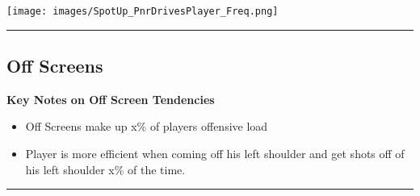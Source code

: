 \documentclass[a4paper,12pt]{article}
\begin{document}
\begin{table}[H]
{\begin{minipage}[t]{0.6\textwidth}
{\begin{tabular}
                
            

            \bottomrule
        \end{tabular}
        } %
    \end{minipage}
    } %
    \hfill %
    \begin{minipage}[c]{0.35\textwidth} %
        \flushright
        \texttt{[image: images/SpotUp\_PnrDrivesPlayer\_Freq.png]} %
    \end{minipage}
\end{table}

\vspace{-1em} %
\hrule height 1pt width 1\textwidth %
\vspace{1em} %
\clearpage











\subsection{Off Screens}
\vspace{1.25em} %
\textbf{Key Notes on Off Screen Tendencies}
\vspace{0.5em} %

\begin{itemize}
    \item Off Screens make up x\% of players offensive load
    \vspace{0.3em} %
    \item Player is more efficient when coming off his left shoulder and get shots off of his left shoulder x\% of the time.
\end{itemize}

\vspace{1em} %
\hrule height 1pt width 1\textwidth %
\vspace{0em} %
\end{document}
